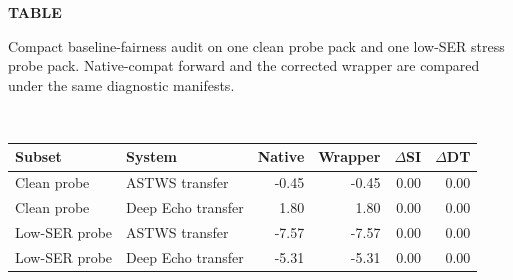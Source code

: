 \par\noindent
{}
\label{tab:baseline-audit}
\begin{center}
\textbf{TABLE \thetable}\\
\parbox{0.96\linewidth}{\centering Compact baseline-fairness audit on one clean probe pack and one low-SER stress probe pack. Native-compat forward and the corrected wrapper are compared under the same diagnostic manifests.}\\[0.5ex]
\scriptsize
\begin{tabular}{llrrrr}
\hline
Subset & System & Native & Wrapper & $\Delta$SI & $\Delta$DT \\
\hline
Clean probe & ASTWS transfer & -0.45 & -0.45 & 0.00 & 0.00 \\
Clean probe & Deep Echo transfer & 1.80 & 1.80 & 0.00 & 0.00 \\
Low-SER probe & ASTWS transfer & -7.57 & -7.57 & 0.00 & 0.00 \\
Low-SER probe & Deep Echo transfer & -5.31 & -5.31 & 0.00 & 0.00 \\
\hline
\end{tabular}
\end{center}
\par
